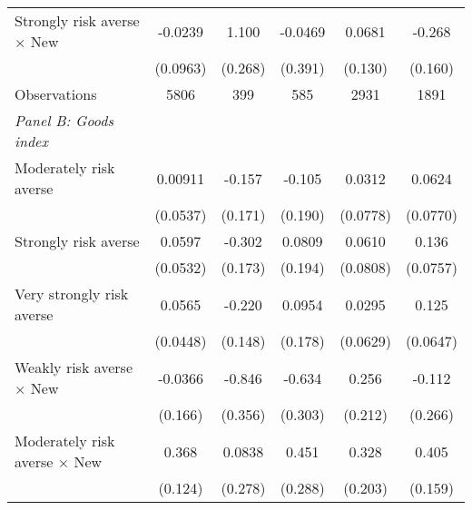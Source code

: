 {\begin{longtable}{l*{5}{c}}
Strongly risk averse $\times$ New&     -0.0239         &       1.100\sym{***}&     -0.0469         &      0.0681         &      -0.268\sym{*}  \\
                    &    (0.0963)         &     (0.268)         &     (0.391)         &     (0.130)         &     (0.160)         \\
\midrule
Observations        &        5806         &         399         &         585         &        2931         &        1891         \\

\midrule
\textit{Panel B: Goods index} & & & & & \\
Moderately risk averse&     0.00911         &      -0.157         &      -0.105         &      0.0312         &      0.0624         \\
                    &    (0.0537)         &     (0.171)         &     (0.190)         &    (0.0778)         &    (0.0770)         \\

Strongly risk averse&      0.0597         &      -0.302\sym{*}  &      0.0809         &      0.0610         &       0.136\sym{*}  \\
                    &    (0.0532)         &     (0.173)         &     (0.194)         &    (0.0808)         &    (0.0757)         \\

Very strongly risk averse&      0.0565         &      -0.220         &      0.0954         &      0.0295         &       0.125\sym{*}  \\
                    &    (0.0448)         &     (0.148)         &     (0.178)         &    (0.0629)         &    (0.0647)         \\

Weakly risk averse $\times$ New&     -0.0366         &      -0.846\sym{**} &      -0.634\sym{**} &       0.256         &      -0.112         \\
                    &     (0.166)         &     (0.356)         &     (0.303)         &     (0.212)         &     (0.266)         \\

Moderately risk averse $\times$ New&       0.368\sym{***}&      0.0838         &       0.451         &       0.328         &       0.405\sym{**} \\
                    &     (0.124)         &     (0.278)         &     (0.288)         &     (0.203)         &     (0.159)         \\


\end{longtable}}
